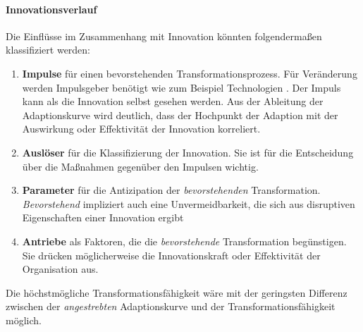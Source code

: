 \paragraph{Innovationsverlauf}
Die Einflüsse im Zusammenhang mit Innovation könnten folgendermaßen klassifiziert werden:
\begin{enumerate}
    \item \textbf{Impulse} für einen bevorstehenden Transformationsprozess. Für Veränderung werden Impulsgeber benötigt wie zum Beispiel Technologien \cite{Bussmann2006, Gupta:2017}. Der Impuls kann als die Innovation selbst gesehen werden. Aus der Ableitung der Adaptionskurve \cite[Abb. 2.1]{Alt2017} wird deutlich, dass der Hochpunkt der Adaption mit der Auswirkung oder Effektivität der Innovation korreliert.
    \item \textbf{Auslöser} für die Klassifizierung der Innovation. Sie ist für die Entscheidung über die Maßnahmen gegenüber den Impulsen wichtig.
    \item \textbf{Parameter} für die Antizipation der \emph{bevorstehenden} Transformation. \emph{Bevorstehend} impliziert auch eine Unvermeidbarkeit, die sich aus disruptiven Eigenschaften einer Innovation ergibt \cite{Fernandez:2020, Gupta:2017}
    \item \textbf{Antriebe} als Faktoren, die die \emph{bevorstehende} Transformation begünstigen. Sie drücken möglicherweise die Innovationskraft oder Effektivität der Organisation aus.
\end{enumerate}
Die höchstmögliche Transformationsfähigkeit wäre mit der geringsten Differenz zwischen der \emph{angestrebten} Adaptionskurve \cite[Abb. 2.1]{Alt2017} und der Transformationsfähigkeit möglich.

